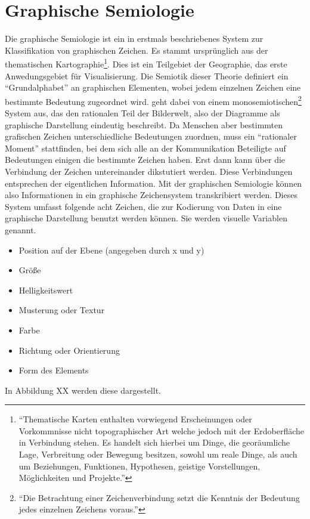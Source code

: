 \documentclass[a4paper, 12pt, DIVcalc, onepage, pdftex, headsepline, footsepline]{scrreprt}
\begin{document}
\section{Graphische Semiologie}
\label{sec:graphischeSemiologie}
Die graphische Semiologie ist ein in \citep{Bertin} erstmals beschriebenes System zur Klassifikation von graphischen Zeichen.
Es stammt ursprünglich aus der thematischen Kartographie\footnote{"`Thematische Karten enthalten vorwiegend
Erscheinungen oder Vorkommnisse nicht topographischer Art welche jedoch mit der Erdoberfläche in Verbindung
stehen. Es handelt sich hierbei um Dinge, die georäumliche Lage, Verbreitung oder Bewegung besitzen, sowohl
um reale Dinge, als auch um Beziehungen, Funktionen, Hypothesen, geistige Vorstellungen, Möglichkeiten und
Projekte."'\citep{Gitta} }. Dies ist ein Teilgebiet der Geographie, das erste Anwedungsgebiet für
Visualisierung.
Die Semiotik dieser Theorie definiert ein "`Grundalphabet"' an graphischen Elementen, wobei
jedem einzelnen Zeichen eine bestimmte Bedeutung zugeordnet wird. \citep{Bertin} geht dabei von einem
monosemiotischen\footnote{"`Die Betrachtung einer Zeichenverbindung setzt die Kenntnis der Bedeutung jedes
einzelnen Zeichens voraus."'\citep[S.\,3]{Bertin}} System aus, das den rationalen Teil der Bilderwelt, also der Diagramme
als graphische Darstellung eindeutig beschreibt.
Da Menschen aber bestimmten grafischen Zeichen unterschiedliche Bedeutungen zuordnen, muss ein "`rationaler Moment"'
stattfinden, bei dem sich alle an der Kommunikation Beteiligte auf Bedeutungen einigen
die bestimmte Zeichen haben. Erst dann kann über die Verbindung der Zeichen untereinander dikstutiert
werden. Diese Verbindungen entsprechen der eigentlichen Information.
Mit der graphischen Semiologie können also Informationen in ein graphische Zeichensystem
transkribiert werden.
Dieses System umfasst folgende acht Zeichen, die zur Kodierung von Daten in eine graphische Darstellung benutzt
werden können. Sie werden visuelle Variablen genannt.
\begin{itemize}
\item Position auf der Ebene (angegeben durch x und y)
\item Größe
\item Helligkeitswert
\item Musterung oder Textur
\item Farbe
\item Richtung oder Orientierung
\item Form des Elements
\end{itemize}
In Abbildung XX werden diese dargestellt.
\end{document}
